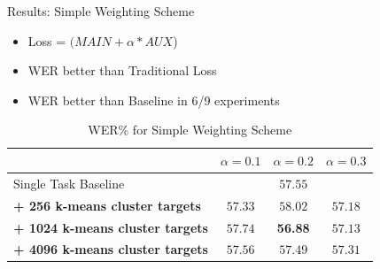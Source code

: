 \documentclass[final]{beamer} %
\begin{document}
\begin{frame}
\begin{columns}
\begin{column}{0.23\textwidth}
{          \vfill
          
        
        \begin{block}{\boxnumber Results: Simple Weighting Scheme}
          \begin{itemize}
          \item Loss = $(MAIN + \alpha*AUX$)
          \item WER better than Traditional Loss
          \item WER better than Baseline in 6/9 experiments
          \end{itemize}
        \end{block}        

        \vfill
        
        
        \begin{table}[!htbp]
          \centering
          \caption{WER\% for Simple Weighting Scheme}
          \begin{adjustbox}{width=\textwidth}
            \begin{tabular}{lccc}
              \toprule
              & $\alpha = 0.1 $ & $\alpha = 0.2 $ & $\alpha = 0.3 $\\
              \midrule
              Single Task Baseline  &  \multicolumn{3}{c}{$57.55$ \raisebox{.33\height}{\footnotesize{$\pm 1.82$}}}     \\
              
              \textbf{+ 256 k-means cluster targets}  &  $57.33$ \raisebox{.33\height}{\footnotesize{$\pm 2.49$}}   &  $58.02$ \raisebox{.33\height}{\footnotesize{$\pm 2.09$}}     & $57.18$ \raisebox{.33\height}{\footnotesize{$\pm 0.56$}} \\
              
              \textbf{+ 1024 k-means cluster targets}   & $ 57.74$ \raisebox{.33\height}{\footnotesize{$\pm 3.06$}}    & \textbf{56.88}  \raisebox{.33\height}{\footnotesize{$\pm 1.33$}}    & $57.13  $ \raisebox{.33\height}{\footnotesize{$\pm 1.55$}}  \\
              
              \textbf{+ 4096 k-means cluster targets}   &  $57.56$ \raisebox{.33\height}{\footnotesize{$\pm 2.53$}}  & $57.49$ \raisebox{.33\height}{\footnotesize{$\pm  3.17$}}   &  $57.31$ \raisebox{.33\height}{\footnotesize{$\pm 1.31$}}  \\
              \bottomrule
            \end{tabular}
          \end{adjustbox}
        \end{table}
        
}
\end{column}
\end{columns}
\end{frame}
\end{document}

